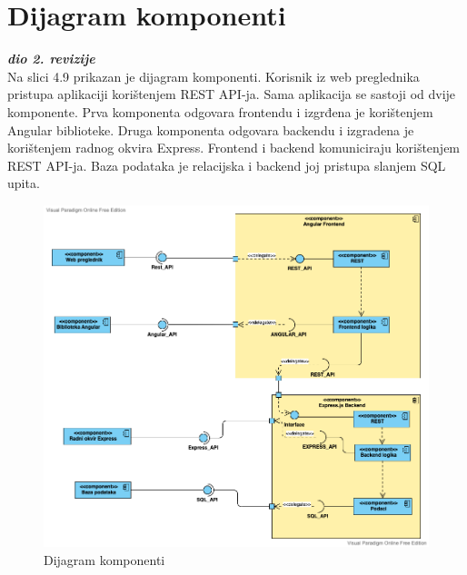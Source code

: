 			\eject
		\section{Dijagram komponenti}
		
			\textbf{\textit{dio 2. revizije}}\\
		
			 
			 Na slici 4.9 prikazan je dijagram komponenti. Korisnik iz web preglednika pristupa aplikaciji korištenjem REST API-ja. Sama aplikacija se sastoji od dvije komponente. Prva komponenta odgovara frontendu i izgrđena je korištenjem Angular biblioteke. Druga komponenta odgovara backendu i izgradena je korištenjem radnog okvira Express. Frontend i backend komuniciraju korištenjem REST API-ja. Baza podataka je relacijska i backend joj pristupa slanjem SQL upita.
			 
			 \begin{figure}[H]
			            \includegraphics[width=\textwidth]{slike/komponenti_v2.png} %
			          \caption{Dijagram komponenti}
			            \label{fig:comp} %
		      \end{figure}